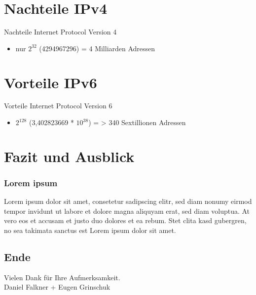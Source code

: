 \documentclass[xcolor=dvipsnames]{beamer}
\newcommand*{\Author}{Daniel Falkner + Eugen Grinschuk} %
\begin{document}

\section{Nachteile IPv4}
\begin{frame}
  \begin{alertblock}{Nachteile Internet Protocol Version 4}
	  \begin{itemize}
  		\item nur $2^{32}$ (4294967296) = 4 Milliarden Adressen
	  \end{itemize}
  \end{alertblock}
\end{frame}

\section{Vorteile IPv6}
\begin{frame}
  \begin{block}{Vorteile Internet Protocol Version 6}
	  \begin{itemize}
  		\item $2^{128}$ (3,402823669 * $10^{38}$) = > 340 Sextillionen Adressen
	  \end{itemize}
  \end{block}
\end{frame}



\section{Fazit und Ausblick}
\begin{frame}
 \frametitle{Lorem ipsum}
  Lorem ipsum dolor sit amet, consetetur sadipscing elitr, sed diam nonumy eirmod tempor invidunt ut labore et dolore magna aliquyam erat, sed diam voluptua. At vero eos et accusam et justo duo dolores et ea rebum. Stet clita kasd gubergren, no sea takimata sanctus est Lorem ipsum dolor sit amet.
\end{frame}

\subsection*{Ende}
\begin{frame}
	\begin{block}{}	
		\begin{center}
			Vielen Dank für Ihre Aufmerksamkeit. \\
			\Author{}
		\end{center}	
	\end{block}
\end{frame}
\end{document}
